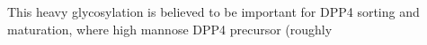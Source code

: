 This heavy glycosylation is believed to be important for DPP4 sorting and maturation, where high mannose DPP4 precursor (roughly \cite{Matter_1991}